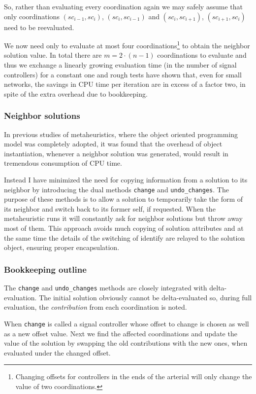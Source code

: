 So, rather than evaluating every coordination again we may safely assume that only coordinations $(sc_{i-1},sc_{i})$, $(sc_{i},sc_{i-1})$ and $(sc_{i},sc_{i+1})$, $(sc_{i+1},sc_{i})$ need to be reevaluated. 

We now need only to evaluate at most four coordinations\footnote{Changing offsets for controllers in the ends of the arterial will only change the value of two coordinations.} to obtain the neighbor solution value. In total there are $m = 2\cdot (n-1)$ coordinations to evaluate and thus we exchange a linearly growing evaluation time (in the number of signal controllers) for a constant one and rough tests have shown that, even for small networks, the savings in CPU time per iteration are in excess of a factor two, in spite of the extra overhead due to bookkeeping.

\subsubsection{Neighbor solutions}
In previous studies of metaheuristics, where the object oriented programming model was completely adopted, it was found that the overhead of object instantiation, whenever a neighbor solution was generated, would result in tremendous consumption of CPU time. 

Instead I have minimized the need for copying information from a solution to its neighbor by introducing the dual methods \verb|change| and \verb|undo_changes|. The purpose of these methods is to allow a solution to temporarily take the form of its neighbor and switch back to its former self, if requested. 
When the metaheuristic runs it will constantly ask for neighbor solutions but throw away most of them. This approach avoids much copying of solution attributes and at the same time the details of the switching of identify are relayed to the solution object, ensuring proper encapsulation.

\subsubsection{Bookkeeping outline}
The \verb|change| and \verb|undo_changes| methods are closely integrated with delta-evaluation. The initial solution obviously cannot be delta-evaluated so, during full evaluation, the \textit{contribution} from each coordination is noted. 

When \verb|change| is called a signal controller whose offset to change is chosen as well as a new offset value. Next we find the affected coordinations and update the value of the solution by swapping the old contributions with the new ones, when evaluated under the changed offset.

